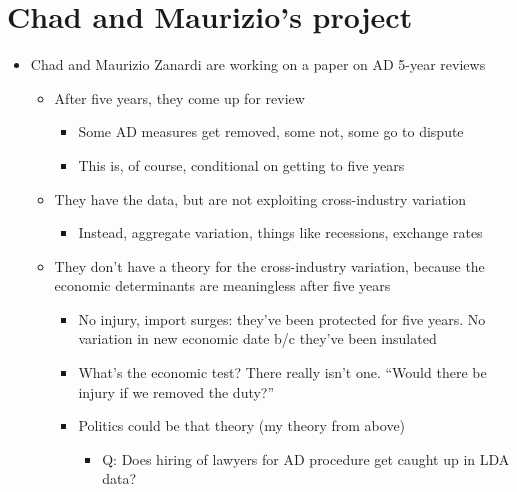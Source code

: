 \documentclass[12pt]{article}
\begin{document}
\section{Chad and Maurizio's project}
\begin{itemize}
	\item Chad and Maurizio Zanardi are working on a paper on AD 5-year reviews
		\begin{itemize}
			\item After five years, they come up for review 
				\begin{itemize}
					\item Some AD measures get removed, some not, some go to dispute
					\item This is, of course, conditional on getting to five years
				\end{itemize}
			\item They have the data, but are not exploiting cross-industry variation
				\begin{itemize}
					\item Instead, aggregate variation, things like recessions, exchange rates
				\end{itemize}
			\item They don't have a theory for the cross-industry variation, because the economic determinants are meaningless after five years
				\begin{itemize}
					\item No injury, import surges: they've been protected for five years. No variation in new economic date b/c they've been insulated
					\item What's the economic test? There really isn't one. ``Would there be injury if we removed the duty?''
					\item Politics could be that theory (my theory from above)
						\begin{itemize}
							\item Q: Does hiring of lawyers for AD procedure get caught up in LDA data?
						\end{itemize}
				\end{itemize}
		\end{itemize}
\end{itemize}

		
\end{document}
